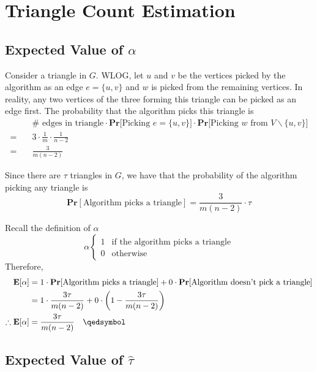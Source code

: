 \section{Triangle Count Estimation}

\subsection{Expected Value of $\alpha$}

Consider a triangle in $G$. WLOG, let $u$ and $v$ be the vertices picked by the algorithm as an edge $e = \{u, v\}$ and $w$ is picked from the remaining vertices. In reality, any two vertices of the three forming this triangle can be picked as an edge first. The probability that the algorithm picks this triangle is
\begin{equation*}
\begin{aligned}
  & \text{$\#$ edges in triangle} \cdot
    \text{$\mathbf{Pr}$[Picking $e = \{u, v\}$]} \cdot
    \text{$\mathbf{Pr}$[Picking $w$ from $V\backslash\{u, v\}$]} \\
  =\quad & 3 \cdot \frac{1}{m} \cdot \frac{1}{n-2} \\
  =\quad & \frac{3}{m(n-2)}
\end{aligned}
\end{equation*}

Since there are $\tau$ triangles in $G$, we have that the probability of the algorithm picking any triangle is 
\[
  \mathbf{Pr}[\text{Algorithm picks a triangle}] = \frac{3}{m(n-2)} \cdot \tau
\]

Recall the definition of $\alpha$
\[
  \alpha \begin{cases}
    1 & \text{if the algorithm picks a triangle} \\
    0 & \text{otherwise}
  \end{cases}
\]
Therefore, 
\begin{equation*}
\begin{aligned}
  \mathbf{E}[\alpha]
    &= 1 \cdot \mathbf{Pr}[\text{Algorithm picks a triangle}] + 0 \cdot \mathbf{Pr}[\text{Algorithm doesn't pick a triangle}] \\
    &= 1 \cdot \frac{3\tau}{m(n-2)} + 0 \cdot \left(1 - \frac{3\tau}{m(n-2)}\right) \\
  \therefore \mathbf{E}[\alpha]
    &= \frac{3\tau}{m(n-2)} \quad \qedsymbol
\end{aligned}
\end{equation*}

\subsection{Expected Value of $\hat{\tau}$}

